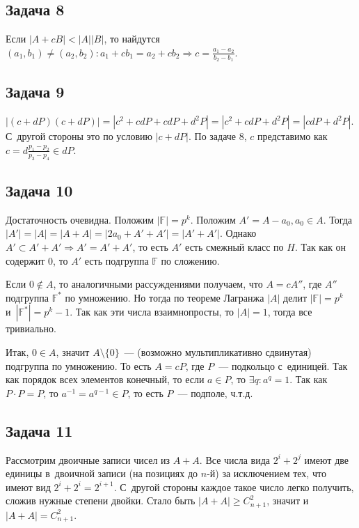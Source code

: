 \documentclass{article}
\begin{document}
\subsection*{Задача 8}
	Если $|A + cB| < |A||B|$, то найдутся $(a_1, b_1) \ne (a_2, b_2): a_1 + cb_1 =
	a_2 + cb_2 \Rightarrow c = \frac{a_1 - a_2}{b_2 - b_1}$.

\subsection*{Задача 9}
	$|(c + dP)(c + dP)| = |c^2 + cdP + cdP + d^2P| = |c^2 + cdP + d^2P| = |cdP +
	d^2P|$. С~другой стороны это по условию $|c + dP|$. По задаче 8,
	$c$ представимо как $c = d\frac{p_1 - p_2}{p_3 - p_4} \in dP$.

\subsection*{Задача 10}
	Достаточность очевидна. Положим $|\mathbb{F}| = p^k$. Положим $A' = A - a_0,
	a_0 \in A$. Тогда $|A'| = |A| = |A + A| = |2a_0 + A' + A'| = |A' + A'|$.
	Однако $A' \subset A' + A' \Rightarrow A' = A' + A'$, то есть $A'$ есть
	смежный класс по $H$. Так как он содержит 0, то $A'$ есть подгруппа
	$\mathbb{F}$ по сложению.

	Если $0 \notin A$, то аналогичными рассуждениями получаем, что $A = cA''$, где
	$A''$ подгруппа $\mathbb{F^\ast}$ по умножению. Но тогда по теореме Лагранжа
	$|A|$ делит $|\mathbb{F}| = p^k$ и~$|\mathbb{F^\ast}| = p^k - 1$. Так как эти
	числа взаимнопросты, то $|A| = 1$, тогда все тривиально.

	Итак, $0 \in A$, значит $A \setminus \{0\}$~--- (возможно мультипликативно
	сдвинутая) подгруппа по умножению. То есть $A = cP$, где $P$~--- подкольцо
	с~единицей. Так как порядок всех элементов конечный, то если $a \in P$, то
	$\exists q: a^q = 1$. Так как $P \cdot P = P$, то $a^{-1} = a^{q-1} \in P$, то
	есть $P$~--- подполе, ч.т.д.

\subsection*{Задача 11}
	Рассмотрим двоичные записи чисел из $A + A$. Все числа вида $2^i + 2^j$ имеют
	две единицы в~двоичной записи (на позициях до $n$-й) за исключением тех, что
	имеют вид $2^i + 2^i = 2^{i+1}$. С~другой стороны каждое такое число легко
	получить, сложив нужные степени двойки. Стало быть $|A + A| \ge C_{n+1}^2$,
	значит и~$|A + A| = C_{n+1}^2$.
\end{document}
